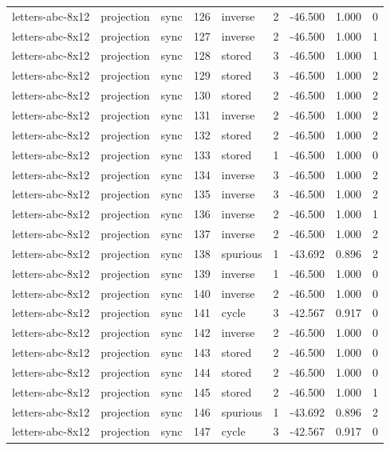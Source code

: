 \begin{tabular}{lllrlrrrr}
letters-abc-8x12 & projection & sync & 126 & inverse & 2 & -46.500 & 1.000 & 0 \\
letters-abc-8x12 & projection & sync & 127 & inverse & 2 & -46.500 & 1.000 & 1 \\
letters-abc-8x12 & projection & sync & 128 & stored & 3 & -46.500 & 1.000 & 1 \\
letters-abc-8x12 & projection & sync & 129 & stored & 3 & -46.500 & 1.000 & 2 \\
letters-abc-8x12 & projection & sync & 130 & stored & 2 & -46.500 & 1.000 & 2 \\
letters-abc-8x12 & projection & sync & 131 & inverse & 2 & -46.500 & 1.000 & 2 \\
letters-abc-8x12 & projection & sync & 132 & stored & 2 & -46.500 & 1.000 & 2 \\
letters-abc-8x12 & projection & sync & 133 & stored & 1 & -46.500 & 1.000 & 0 \\
letters-abc-8x12 & projection & sync & 134 & inverse & 3 & -46.500 & 1.000 & 2 \\
letters-abc-8x12 & projection & sync & 135 & inverse & 3 & -46.500 & 1.000 & 2 \\
letters-abc-8x12 & projection & sync & 136 & inverse & 2 & -46.500 & 1.000 & 1 \\
letters-abc-8x12 & projection & sync & 137 & inverse & 2 & -46.500 & 1.000 & 2 \\
letters-abc-8x12 & projection & sync & 138 & spurious & 1 & -43.692 & 0.896 & 2 \\
letters-abc-8x12 & projection & sync & 139 & inverse & 1 & -46.500 & 1.000 & 0 \\
letters-abc-8x12 & projection & sync & 140 & inverse & 2 & -46.500 & 1.000 & 0 \\
letters-abc-8x12 & projection & sync & 141 & cycle & 3 & -42.567 & 0.917 & 0 \\
letters-abc-8x12 & projection & sync & 142 & inverse & 2 & -46.500 & 1.000 & 0 \\
letters-abc-8x12 & projection & sync & 143 & stored & 2 & -46.500 & 1.000 & 0 \\
letters-abc-8x12 & projection & sync & 144 & stored & 2 & -46.500 & 1.000 & 0 \\
letters-abc-8x12 & projection & sync & 145 & stored & 2 & -46.500 & 1.000 & 1 \\
letters-abc-8x12 & projection & sync & 146 & spurious & 1 & -43.692 & 0.896 & 2 \\
letters-abc-8x12 & projection & sync & 147 & cycle & 3 & -42.567 & 0.917 & 0 \\

\end{tabular}
